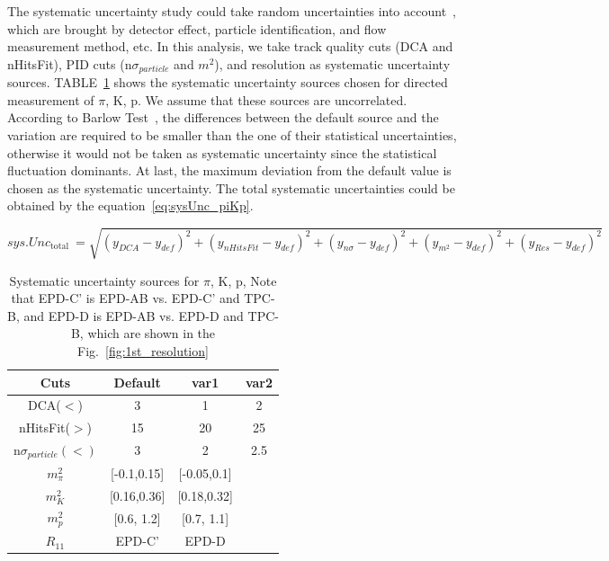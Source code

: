 The systematic uncertainty study could take random uncertainties into account~\cite{barlow2002systematic}, which are brought by detector effect, particle identification, and flow measurement method, etc.
In this analysis, we take track quality cuts (DCA and nHitsFit), PID cuts (n$\sigma_{particle}$ and $m^2$), and resolution as systematic uncertainty sources.
TABLE~\ref{tab:piKp_sysUnc} shows the systematic uncertainty sources chosen for directed measurement of $\pi$, K, p.
We assume that these sources are uncorrelated. According to Barlow Test~\cite{barlow2002systematic}, the differences between the default source and the variation are required
to be smaller than the one of their statistical uncertainties, otherwise it would not be taken as systematic uncertainty since the statistical fluctuation dominants.
At last, the maximum deviation from the default value is chosen as the systematic uncertainty. 
The total systematic uncertainties could be obtained by the equation~\ref{eq:sysUnc_piKp}.

\begin{equation}
s y s. Unc_{\text {total }}=\sqrt{\left(y_{DCA}-y_{d e f}\right)^2+\left(y_{n H i tsFit}-y_{d e f}\right)^2+\left(y_{n \sigma}-y_{d e f}\right)^2+\left(y_{m^2}-y_{d e f}\right)^2+\left(y_{Res}-y_{d e f}\right)^2}
\label{eq:sysUnc_piKp}
\end{equation}

\begin{table}
    \centering
    \begin{tabular}{|c|c|c|c|} \hline  
         Cuts&  Default&  var1& var2\\ \hline  
         DCA($<$)&  3&  1& 2\\ \hline  
         nHitsFit($>$)&  15&  20& 25\\ \hline  
         n$\sigma_{particle} (<)$&  3&  2& 2.5\\ \hline  
         $m^2_\pi$&  [-0.1,0.15]&  [-0.05,0.1]
& \\ \hline 
 $m^2_K$& [0.16,0.36]
& [0.18,0.32]
&\\ \hline 
 $m^2_p$& [0.6, 1.2]& [0.7, 1.1]&\\ \hline 
         $R_{11}$&  EPD-C'&  EPD-D& \\ \hline 
    \end{tabular}
    \caption{Systematic uncertainty sources for $\pi$, K, p, Note that EPD-C' is EPD-AB vs. EPD-C' and TPC-B, and EPD-D is EPD-AB vs. EPD-D and TPC-B,
    which are shown in the Fig.~\ref{fig:1st_resolution}}
    \label{tab:piKp_sysUnc}
\end{table}

